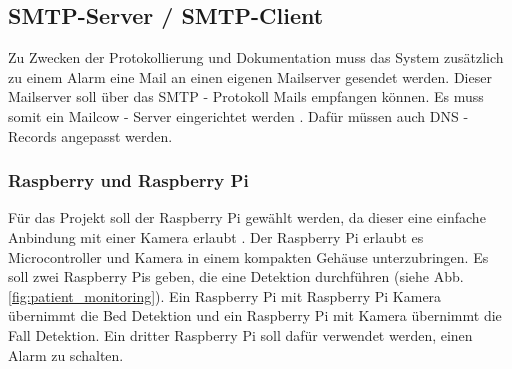 \subsection{SMTP-Server / SMTP-Client}
Zu Zwecken der Protokollierung und Dokumentation muss das System zusätzlich zu einem Alarm eine Mail an einen eigenen Mailserver gesendet werden. Dieser Mailserver soll über das SMTP - Protokoll Mails empfangen können. Es muss somit ein Mailcow - Server eingerichtet werden  \cite{Mailcow} . Dafür müssen auch DNS - Records angepasst werden. 

\subsubsection{Raspberry und Raspberry Pi} \label{sec:raspi}
Für das Projekt soll der Raspberry Pi gewählt werden, da dieser eine einfache Anbindung mit einer Kamera erlaubt \cite{Raspberry}  \cite{Raspberry_camera}. Der Raspberry Pi erlaubt es Microcontroller und Kamera in einem kompakten Gehäuse unterzubringen.  Es soll zwei Raspberry Pis geben, die eine Detektion  durchführen (siehe Abb. \ref{fig:patient_monitoring}). Ein Raspberry Pi mit Raspberry Pi Kamera übernimmt die Bed Detektion und ein Raspberry Pi mit Kamera übernimmt die Fall Detektion. Ein dritter Raspberry Pi soll  dafür verwendet werden,  einen Alarm zu schalten. 

